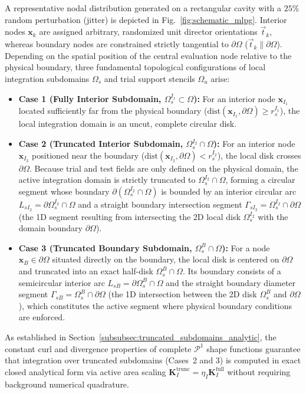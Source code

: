 \documentclass[preprint,12pt]{elsarticle}
\begin{document}
A representative nodal distribution generated on a rectangular cavity with a $25\%$ random perturbation (jitter) is depicted in Fig.~\ref{fig:schematic_mlpg}. Interior nodes $\mathbf{x}_k$ are assigned arbitrary, randomized unit director orientations $\vec{t}_k$, whereas boundary nodes are constrained strictly tangential to $\partial\Omega$ ($\vec{t}_k \parallel \partial\Omega$). Depending on the spatial position of the central evaluation node relative to the physical boundary, three fundamental topological configurations of local integration subdomains $\Omega_s$ and trial support stencils $\Omega_u$ arise:
\begin{itemize}
    \item \textbf{Case 1 (Fully Interior Subdomain, $\Omega_s^{I_1} \subset \Omega$):} For an interior node $\mathbf{x}_{I_1}$ located sufficiently far from the physical boundary ($\mathrm{dist}(\mathbf{x}_{I_1}, \partial\Omega) \ge r_s^{I_1}$), the local integration domain is an uncut, complete circular disk.
    \item \textbf{Case 2 (Truncated Interior Subdomain, $\Omega_s^{I_2} \cap \Omega$):} For an interior node $\mathbf{x}_{I_2}$ positioned near the boundary ($\mathrm{dist}(\mathbf{x}_{I_2}, \partial\Omega) < r_s^{I_2}$), the local disk crosses $\partial\Omega$. Because trial and test fields are only defined on the physical domain, the active integration domain is strictly truncated to $\Omega_s^{I_2} \cap \Omega$, forming a circular segment whose boundary $\partial(\Omega_s^{I_2} \cap \Omega)$ is bounded by an interior circular arc $L_{sI_2} = \partial\Omega_s^{I_2} \cap \Omega$ and a straight boundary intersection segment $\Gamma_{sI_2} = \Omega_s^{I_2} \cap \partial\Omega$ (the 1D segment resulting from intersecting the 2D local disk $\Omega_s^{I_2}$ with the domain boundary $\partial\Omega$).
    \item \textbf{Case 3 (Truncated Boundary Subdomain, $\Omega_s^B \cap \Omega$):} For a node $\mathbf{x}_B \in \partial\Omega$ situated directly on the boundary, the local disk is centered on $\partial\Omega$ and truncated into an exact half-disk $\Omega_s^B \cap \Omega$. Its boundary consists of a semicircular interior arc $L_{sB} = \partial\Omega_s^B \cap \Omega$ and the straight boundary diameter segment $\Gamma_{sB} = \Omega_s^B \cap \partial\Omega$ (the 1D intersection between the 2D disk $\Omega_s^B$ and $\partial\Omega$), which constitutes the active segment where physical boundary conditions are enforced.
\end{itemize}
As established in Section~\ref{subsubsec:truncated_subdomains_analytic}, the constant curl and divergence properties of complete $\mathcal{P}^1$ shape functions guarantee that integration over truncated subdomains (Cases~2 and 3) is computed in exact closed analytical form via active area scaling $\mathbf{K}_I^{\mathrm{trunc}} = \eta_I \mathbf{K}_I^{\mathrm{full}}$ without requiring background numerical quadrature.
\end{document}
